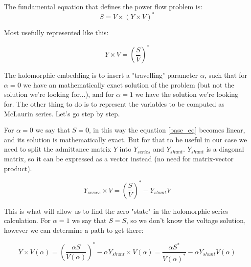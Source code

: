 \documentclass[nols,a4paper,twoside,notoc,fleqn]{tufte-book}
\begin{document}
The fundamental equation that defines the power flow problem is:
\begin{equation}
{S} = {V} \times ({Y} \times {V})^*
\end{equation}

Most usefully represented like this:


\begin{equation}
{{Y} \times {V}} = \left(\frac{{S}}{{V}}\right)^* 
\label{base_eq}
\end{equation}


The holomorphic embedding is to insert a "travelling" parameter $\alpha$, such that for $\alpha=0$ we have an mathematically exact solution of the problem (but not the solution we're looking for...), and for $\alpha=1$ we have the solution we're looking for. The other thing to do is to represent the variables to be computed as McLaurin series. Let's go step by step.\newline

For $\alpha=0$ we say that $S=0$, in this way the equation \ref{base_eq} becomes linear, and its solution is mathematically exact. But for that to be useful in our case we need to split the admittance matrix $Y$ into $Y_{series}$ and $Y_{shunt}$. $Y_{shunt}$ is a diagonal matrix, so it can be expressed as a vector instead (no need for matrix-vector product).

\begin{equation}
{Y}_{series} \times {V} = \left(\frac{{S}}{{V}}\right)^* - {Y}_{shunt} {V}
\label{base_eq_alpha_0}
\end{equation}

This is what will allow us to find the zero "state" in the holomorphic series calculation. For $\alpha=1$ we say that $S=S$, so we don't know the voltage solution, however we can determine a path to get there:

\begin{equation}
{    {Y }\times     {V}( \alpha )} = \left(\frac{ \alpha    {S}}{{V}( \alpha )}\right)^* - \alpha {Y}_{shunt} \times {V}( \alpha ) = \frac{ \alpha{S}^*}{{V}( \alpha )^*} - \alpha {Y}_{shunt} {V}( \alpha )
\label{base_eq_embedded}
\end{equation}
\end{document}
